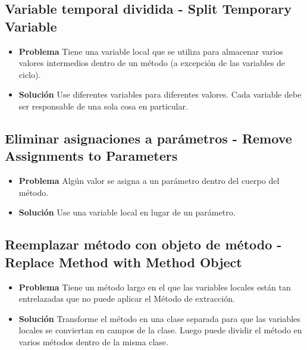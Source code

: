 \documentclass[11pt,a4paper,oneside]{book}
\begin{document}
\subsection{Variable temporal dividida - Split Temporary Variable}
\label{splittemporaryvariable}
\begin{itemize}
    \item \textbf{Problema} Tiene una variable local que se utiliza para almacenar varios valores intermedios dentro de un método (a excepción de las variables de ciclo).
    \item \textbf{Solución} Use diferentes variables para diferentes valores. Cada variable debe ser responsable de una sola cosa en particular.
\end{itemize}



\subsection{Eliminar asignaciones a parámetros - Remove Assignments to Parameters}
\label{removeassignmentstoparameters}
\begin{itemize}
    \item \textbf{Problema} Algún valor se asigna a un parámetro dentro del cuerpo del método.
    \item \textbf{Solución} Use una variable local en lugar de un parámetro.
\end{itemize}



\subsection{Reemplazar método con objeto de método - Replace Method with Method Object}
\label{replacemethodwithmethodobject}
\begin{itemize}
    \item \textbf{Problema} Tiene un método largo en el que las variables locales están tan entrelazadas que no puede aplicar el Método de extracción.
    \item \textbf{Solución} Transforme el método en una clase separada para que las variables locales se conviertan en campos de la clase. Luego puede dividir el método en varios métodos dentro de la misma clase.
\end{itemize}


\end{document}
